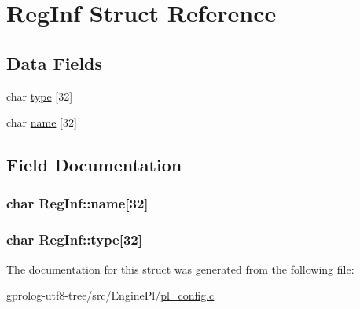 \hypertarget{structRegInf}{}\section{Reg\+Inf Struct Reference}
\label{structRegInf}
\subsection*{Data Fields}
\begin{DoxyCompactItemize}
\item 
char \hyperlink{structRegInf_ac0222d4bcdce57bdcd74c2d45b9dfeb5}{type} \mbox{[}32\mbox{]}
\item 
char \hyperlink{structRegInf_af767d5a12d9d8e248f6c3eae99802e73}{name} \mbox{[}32\mbox{]}
\end{DoxyCompactItemize}


\subsection{Field Documentation}
\subsubsection[{\texorpdfstring{name}{name}}]{\setlength{\rightskip}{0pt plus 5cm}char Reg\+Inf\+::name\mbox{[}32\mbox{]}}\hypertarget{structRegInf_af767d5a12d9d8e248f6c3eae99802e73}{}\label{structRegInf_af767d5a12d9d8e248f6c3eae99802e73}
\subsubsection[{\texorpdfstring{type}{type}}]{\setlength{\rightskip}{0pt plus 5cm}char Reg\+Inf\+::type\mbox{[}32\mbox{]}}\hypertarget{structRegInf_ac0222d4bcdce57bdcd74c2d45b9dfeb5}{}\label{structRegInf_ac0222d4bcdce57bdcd74c2d45b9dfeb5}


The documentation for this struct was generated from the following file\+:\begin{DoxyCompactItemize}
\item 
gprolog-\/utf8-\/tree/src/\+Engine\+Pl/\hyperlink{pl__config_8c}{pl\+\_\+config.\+c}\end{DoxyCompactItemize}
